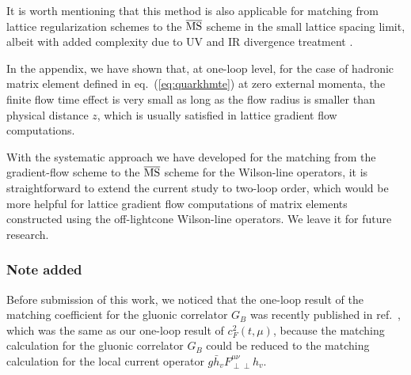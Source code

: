 It is worth mentioning that this method is also applicable for matching from lattice regularization schemes to the $\overline{\rm MS}$ scheme in the small lattice spacing limit, albeit with added complexity due to UV and IR divergence treatment \cite{Constantinou:2017sej}.



In the appendix, we have shown that, at one-loop level, for the case of hadronic matrix element defined in eq.~(\ref{eq:quarkhmte}) at zero external momenta, the finite flow time effect is very small as long as the flow radius is smaller than physical distance $z$, which is usually satisfied in lattice gradient flow computations. 


With the systematic approach we have developed for the matching from the gradient-flow scheme to the $\overline{\rm MS}$ scheme for the Wilson-line operators, 
 it is straightforward to extend the current study to two-loop order, which would be more helpful for lattice gradient flow computations of matrix elements constructed using the off-lightcone Wilson-line operators. We leave it for future research.
 
\subsubsection*{Note added}
Before submission of this work, we noticed that the one-loop result of the matching coefficient for the gluonic correlator $G_B$ was recently published in ref.~\cite{Altenkort:2023eav},  which was the same as our one-loop result of  $c_F^2(t, \mu)$, because the matching calculation for the gluonic correlator $G_B$ could be reduced to the matching calculation for the local current operator $g\bar{h}_vF^{\mu\nu}_{\perp\perp}h_v$.

